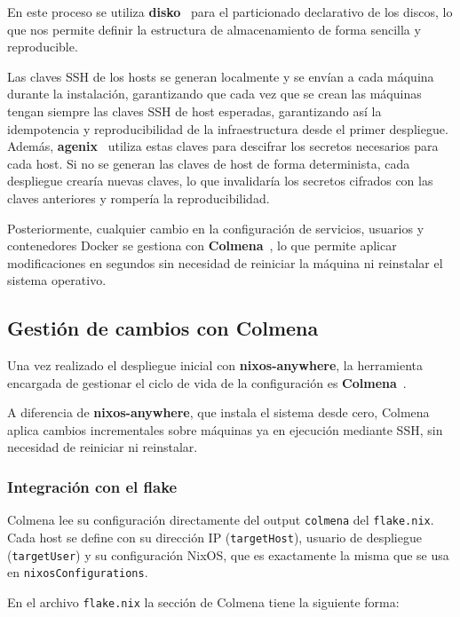 \documentclass[a4paper, 11pt]{article}
\begin{document}
En este proceso se utiliza \textbf{disko}~\cite{disko} para el particionado declarativo 
de los discos, lo que nos permite definir la estructura de almacenamiento de 
forma sencilla y reproducible.

Las claves SSH de los hosts se generan localmente y se envían a cada máquina 
durante la instalación, garantizando que cada vez que se crean las máquinas
tengan siempre las claves SSH de host esperadas, garantizando así la idempotencia
y reproducibilidad de la infraestructura desde el primer despliegue. Además,
\textbf{agenix}~\cite{agenix} utiliza estas claves para descifrar los secretos necesarios 
para cada host. Si no se generan las claves de host de forma determinista, cada 
despliegue crearía nuevas claves, lo que invalidaría los secretos cifrados con 
las claves anteriores y rompería la reproducibilidad.

Posteriormente, cualquier cambio en la configuración de servicios, usuarios y
contenedores Docker se gestiona con \textbf{Colmena}~\cite{colmena}, lo que permite 
aplicar modificaciones en segundos sin necesidad de reiniciar la máquina ni reinstalar 
el sistema operativo.

\subsection{Gestión de cambios con Colmena}

Una vez realizado el despliegue inicial con \textbf{nixos-anywhere}, la 
herramienta encargada de gestionar el ciclo de vida de la configuración es 
\textbf{Colmena}~\cite{colmena}. 

A diferencia de \textbf{nixos-anywhere}, que instala el sistema desde cero, 
Colmena aplica cambios incrementales sobre máquinas ya en ejecución mediante SSH, 
sin necesidad de reiniciar ni reinstalar.

\subsubsection{Integración con el flake}

Colmena lee su configuración directamente del output \texttt{colmena} del \texttt{flake.nix}. 
Cada host se define con su dirección IP (\texttt{targetHost}), usuario de despliegue 
(\texttt{targetUser}) y su configuración NixOS, que es exactamente la misma que 
se usa en \texttt{nixosConfigurations}. 

En el archivo \texttt{flake.nix} la sección de Colmena tiene la siguiente forma:
\end{document}
